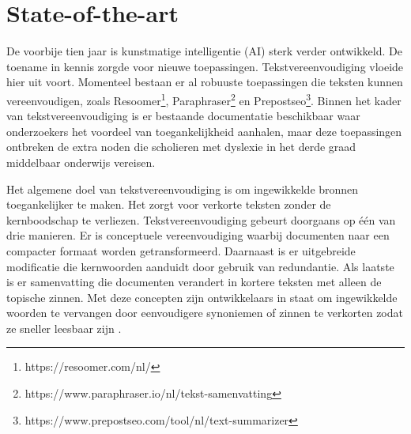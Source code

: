 
\section{State-of-the-art}%
\label{sec:state-of-the-art}


De voorbije tien jaar is kunstmatige intelligentie (AI) sterk verder ontwikkeld. De toename in kennis zorgde voor nieuwe toepassingen. Tekstvereenvoudiging vloeide hier uit voort. Momenteel bestaan er al robuuste toepassingen die teksten kunnen vereenvoudigen, zoals Resoomer\footnote{https://resoomer.com/nl/}, Paraphraser\footnote{https://www.paraphraser.io/nl/tekst-samenvatting} en Prepostseo\footnote{https://www.prepostseo.com/tool/nl/text-summarizer}. Binnen het kader van tekstvereenvoudiging is er bestaande documentatie beschikbaar waar onderzoekers het voordeel van toegankelijkheid aanhalen, maar deze toepassingen ontbreken de extra noden die scholieren met dyslexie in het derde graad middelbaar onderwijs vereisen.

Het algemene doel van tekstvereenvoudiging is om ingewikkelde bronnen toegankelijker te maken. Het zorgt voor verkorte teksten zonder de kernboodschap te verliezen. Tekstvereenvoudiging gebeurt doorgaans op één van drie manieren. Er is conceptuele vereenvoudiging waarbij documenten naar een compacter formaat worden getransformeerd. Daarnaast is er uitgebreide modificatie die kernwoorden aanduidt door gebruik van redundantie. Als laatste is er samenvatting die documenten verandert in kortere teksten met alleen de topische zinnen. Met deze concepten zijn ontwikkelaars in staat om ingewikkelde woorden te vervangen door eenvoudigere synoniemen of zinnen te verkorten zodat ze sneller leesbaar zijn \autocite{Siddharthan2014}.

